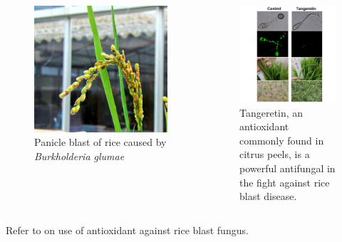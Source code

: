 \documentclass[10pt,dvipsnames,ignorenonframetext,aspectratio=169]{beamer}
\begin{document}
\begin{frame}{}
\protect\hypertarget{section-11}{}
\begin{columns}[T, onlytextwidth]

\begin{figure}
\includegraphics[width=0.84\linewidth]{../images/panicle_bast_rice} \caption{Panicle blast of rice caused by \textit{Burkholderia glumae}}\label{fig:rice-panicle-blast}
\end{figure}


\begin{figure}
\includegraphics[width=0.85\linewidth]{../images/citrus_peel_for_blast_control} \caption{Tangeretin, an antioxidant commonly found in citrus peels, is a powerful antifungal in the fight against rice blast disease.}\label{fig:citrus-peel-rescuse}
\end{figure}

\end{columns}

\footnotesize Refer to \citet{liang2021tangeretin} on use of antioxidant
against rice blast fungus.
\end{frame}
\end{document}
